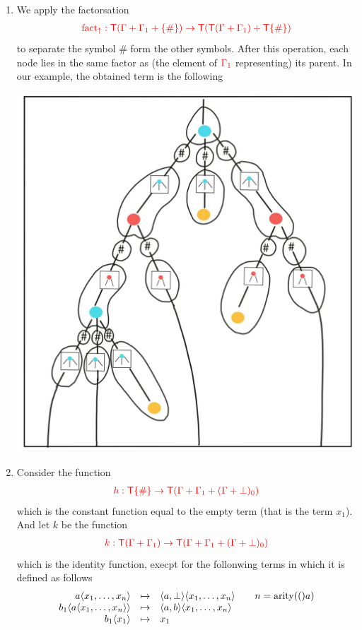 \begin{example}
\begin{enumerate}
\begin{center}
		\end{center}
\item We apply the factorsation 
\begin{align*}
{\color{red}{{\color{red}{\mathrm{fact_{\uparrow}}}}: {\color{red}{\mathsf T}}(\Gamma+\Gamma_1+\{\#\}) \to {\color{red}{\mathsf T}}({\color{red}{\mathsf T}}(\Gamma+\Gamma_1)+{\color{red}{\mathsf T}}\{\#\})}}
\end{align*}
 to separate the symbol $\#$ form the other symbols. After this operation, each node lies in the same factor as (the element of ${\color{red}{\Gamma_1}}$ representing) its parent. In our example, the obtained term is the following
\begin{center}
		\includegraphics[scale=.15]{MyPic5.jpg}
		\end{center}
\item Consider the function 
\begin{align*}
{\color{red}{h: {\color{red}{\mathsf T}}\{\#\} \to {\color{red}{\mathsf T}}(\Gamma+\Gamma_1+(\Gamma+\bot)_0)}}
\end{align*}
which is the constant function equal to the empty term (that is the term $x_1$).
And let $k$ be the function
\begin{align*}
{\color{red}{k: {\color{red}{\mathsf T}}(\Gamma+\Gamma_1) \to {\color{red}{\mathsf T}}(\Gamma+\Gamma_1+(\Gamma+\bot)_0)}}
\end{align*}
which is the identity function, execpt for the follonwing terms in which it is defined as follows
$$\begin{array}{rll}
a\langle{x_1,\dots, x_n}\rangle& \mapsto & \langle{a,\bot}\rangle\langle{x_1,\dots,x_n}\rangle\qquad n=\mathrm{arity}(()a)\\
b_1\langle{a\langle{x_1,\dots,x_n}\rangle}\rangle&\mapsto& \langle{a,b}\rangle\langle{x_1,\dots,x_n}\rangle\\
b_1\langle{x_1}\rangle &\mapsto& x_1
\end{array}$$
\end{enumerate}
	


\end{example}

